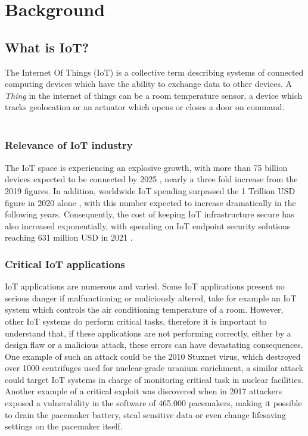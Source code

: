 \chapter{Background}

\section{What is IoT?}

The Internet Of Things (IoT) is a collective term describing systems of connected computing devices which have the ability to exchange data to other devices. A \emph{Thing} in the internet of things can be a room temperature sensor, a device which tracks geolocation or an actuator which opens or closes a door on command.
\\~\\

\subsection{Relevance of IoT industry}
The IoT space is experiencing an explosive growth, with more than 75 billion devices expected to be connected by 2025 \cite{statista}, nearly a three fold increase from the 2019 figures. In addition, worldwide IoT spending surpassed the 1 Trillion USD figure in 2020 alone \cite{sdx}, with this number expected to increase dramatically in the following years. Consequently, the cost of keeping IoT infrastructure secure has also increased exponentially, with spending on IoT endpoint security solutions reaching 631 million USD in 2021 \cite{gartner}.
\\

\subsection{Critical IoT applications}
IoT applications are numerous and varied. Some IoT applications present no serious danger if malfunctioning or maliciously altered, take for example an IoT system which controls the air conditioning temperature of a room. However, other IoT systems do perform critical tasks, therefore it is important to understand that, if these applications are not performing correctly, either by a design flaw or a malicious attack, these errors can have devastating consequences.
\\

One example of such an attack could be the 2010 Stuxnet virus, which destroyed over 1000 centrifuges used for nuclear-grade uranium enrichment, a similar attack could target IoT systems in charge of monitoring critical task in nuclear facilities. Another example of a critical exploit was discovered when in 2017 attackers exposed a vulnerability in the software of 465.000 pacemakers, making it possible to drain the pacemaker battery, steal sensitive data or even change lifesaving settings on the pacemaker itself.
\\

